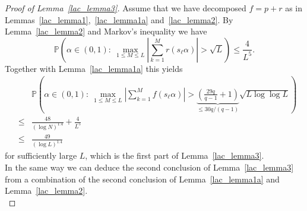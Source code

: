 \documentclass[12pt]{amsart}
\newcommand {\p} {\mathbb{P}}
\begin{document}
\begin{proof}[Proof of Lemma~\ref{lac_lemma3}] 
Assume that we have decomposed $f=p+r$ as in Lemmas~\ref{lac_lemma1},~\ref{lac_lemma1a} and~\ref{lac_lemma2}. By Lemma~\ref{lac_lemma2} and Markov's inequality we have
$$
\p \left( \alpha \in (0,1):~\max_{1 \leq M \leq L} \left| \sum_{k=1}^M r(s_\ell \alpha) \right| > \sqrt{L} \right) \leq \frac{4}{L^5}.
$$
Together with Lemma~\ref{lac_lemma1a} this yields
\begin{eqnarray*}
& & \p \left( \alpha \in (0,1):~\max_{1 \leq M \leq L} \left| \sum_{k=1}^M f(s_\ell \alpha) \right| > \underbrace{\left(\frac{29 q}{q-1}+1\right)}_{\leq 30 q / (q-1)} \sqrt{L \log \log L} \right) \\
& \leq & \frac{48}{(\log N)^{1.4}} + \frac{4}{L^5} \\
& \leq & \frac{49}{(\log L)^{1.4}}
\end{eqnarray*}
for sufficiently large $L$, which is the first part of Lemma~\ref{lac_lemma3}.\\

In the same way we can deduce the second conclusion of Lemma~\ref{lac_lemma3} from a combination of the second conclusion of Lemma~\ref{lac_lemma1a} and Lemma~\ref{lac_lemma2}.\\
\end{proof}
\end{document}
